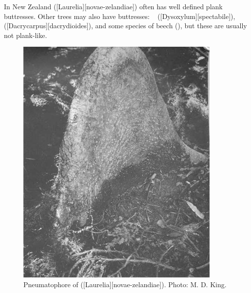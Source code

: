 In New Zealand  ([Laurelia][novae-zelandiae]) often has well defined plank buttresses.
Other trees may also have buttresses: \eg\  ([Dysoxylum][spectabile]),  ([Dacrycarpus][dacrydioides]), and some species of beech (), but these are usually not plank-like.

\begin{figure}[!htb]
	\centering
	\begin{minipage}[t]{0.54\textwidth}
		\centering
		\includegraphics[width=0.9\textwidth]{graphics/figure10pukatea.jpg}
    	\caption[Pneumatophore of pukatea]{Pneumatophore of  ([Laurelia][novae-zelandiae]).
    	Photo:  M. D. King.}%
    	\label{fig:10pukatea}
	\end{minipage}\hfill%
	\begin{minipage}[t]{0.44\textwidth}
    	\centering

\end{minipage}
\end{figure}
